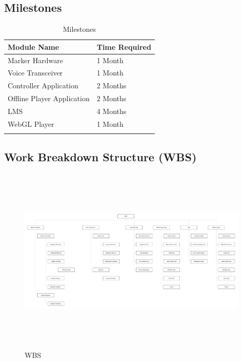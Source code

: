 \documentclass[12pt]{article}
\begin{document}
\subsection{Milestones}
\begin{longtable}{|p{5cm}|p{5cm}|}
\hline
\textbf{Module Name} & \textbf{Time Required}\\
\hline
Marker Hardware &
1 Month\\
\hline

Voice Transceiver &
1 Month \\
\hline

Controller Application &
2 Months \\
\hline

Offline Player Application &
2 Months \\
\hline

LMS &
4 Months \\
\hline

WebGL Player &
1 Month \\
\hline

\caption{Milestones}
\end{longtable}

\subsection{Work Breakdown Structure (WBS)}

\begin{figure}[h]
  \centering
  \includegraphics[width=11cm, height=9cm]{wbs}
  \caption{WBS}
\end{figure}
\end{document}
